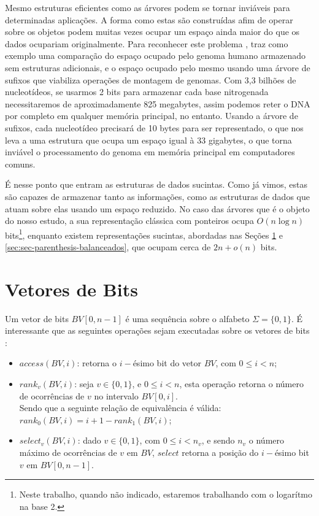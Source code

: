 Mesmo estruturas eficientes como as árvores podem se tornar inviáveis para determinadas aplicações. A forma como estas são construídas afim de operar sobre os objetos podem muitas vezes ocupar um espaço ainda maior do que os dados ocupariam originalmente. Para reconhecer este problema \citet{book-compact-data-structures}, traz como exemplo uma comparação do espaço ocupado pelo genoma humano armazenado sem estruturas adicionais, e o espaço ocupado pelo mesmo usando uma árvore de sufixos que viabiliza operações de montagem de genomas. Com  3,3 bilhões de nucleotídeos, se usarmos 2 bits para armazenar cada base nitrogenada necessitaremos de aproximadamente 825 megabytes, assim podemos reter o DNA por completo em qualquer memória principal, no entanto. Usando a árvore de sufixos, cada nucleotídeo precisará de 10 bytes para ser representado, o que nos leva a uma estrutura que ocupa um espaço igual à 33 gigabytes, o que torna inviável o processamento do genoma em memória principal em computadores comuns. %

É nesse ponto que entram as estruturas de dados sucintas. Como já vimos, estas são capazes de armazenar tanto as informações, como as estruturas de dados que atuam sobre elas usando um espaço reduzido. No caso das árvores que é o objeto do nosso estudo, a sua representação clássica com ponteiros  ocupa  $O(n \log n)$ bits\footnote{Neste trabalho, quando não indicado, estaremos trabalhando com o logarítmo na base 2.}, enquanto existem representações sucintas, abordadas nas Seções \ref{sec:sec-bitvector} e \ref{sec:sec-parenthesis-balanceados}, que ocupam cerca de $2n+o(n)$ bits.

\section{Vetores de Bits}\label{sec:sec-bitvector}
Um vetor de bits $BV[0,n-1]$  é uma sequência sobre o alfabeto $\Sigma = \{0,1\}$. É interessante que as seguintes operações sejam executadas sobre os vetores de bits \citep{book-compact-data-structures}:

\begin{itemize}
    \item $access(BV,i)$: retorna o $i-$ésimo bit do vetor $BV$, com $0 \leq i < n$;
    \item $rank_v(BV,i)$: seja $v \in \{0,1\}$, e $0 \leq i < n$, esta operação retorna o número de ocorrências de $v$ no intervalo $BV[0,i]$.\\
    Sendo que a seguinte relação de equivalência é válida: $rank_0(BV,i)=i +1  - rank_1(BV,i)$;
    \item $select_v(BV,i)$: dado $v \in \{0,1\}$, com $0 \leq i < n_v$, e sendo $n_v$ o número máximo de ocorrências de $v$ em $BV$,
    $select$ retorna a posição do $i-$ésimo bit $v$ em $BV[0,n-1]$.
\end{itemize}

